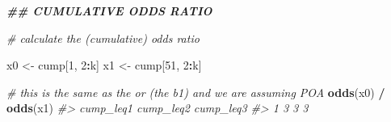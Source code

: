 \documentclass[
  man,floatsintext]{apa6}
\newenvironment{Shaded}{\begin{snugshade}}{\end{snugshade}}
\newcommand{\CommentTok}[1]{\textcolor[rgb]{0.56,0.35,0.01}{\textit{#1}}}
\newcommand{\DecValTok}[1]{\textcolor[rgb]{0.00,0.00,0.81}{#1}}
\newcommand{\DocumentationTok}[1]{\textcolor[rgb]{0.56,0.35,0.01}{\textbf{\textit{#1}}}}
\newcommand{\FunctionTok}[1]{\textcolor[rgb]{0.13,0.29,0.53}{\textbf{#1}}}
\newcommand{\NormalTok}[1]{#1}
\newcommand{\OtherTok}[1]{\textcolor[rgb]{0.56,0.35,0.01}{#1}}
\newcommand{\SpecialCharTok}[1]{\textcolor[rgb]{0.81,0.36,0.00}{\textbf{#1}}}
\begin{document}
\begin{Shaded}
\begin{Highlighting}[]
\DocumentationTok{\#\# CUMULATIVE ODDS RATIO}

\CommentTok{\# calculate the (cumulative) odds ratio}

\NormalTok{x0 }\OtherTok{\textless{}{-}}\NormalTok{ cump[}\DecValTok{1}\NormalTok{, }\DecValTok{2}\SpecialCharTok{:}\NormalTok{k]}
\NormalTok{x1 }\OtherTok{\textless{}{-}}\NormalTok{ cump[}\DecValTok{51}\NormalTok{, }\DecValTok{2}\SpecialCharTok{:}\NormalTok{k]}

\CommentTok{\# this is the same as the or (the b1) and we are assuming POA}
\FunctionTok{odds}\NormalTok{(x0) }\SpecialCharTok{/} \FunctionTok{odds}\NormalTok{(x1)}
\CommentTok{\#\textgreater{}   cump\_leq1 cump\_leq2 cump\_leq3}
\CommentTok{\#\textgreater{} 1         3         3         3}
\end{Highlighting}
\end{Shaded}

\normalsize

\scriptsize
\end{document}
